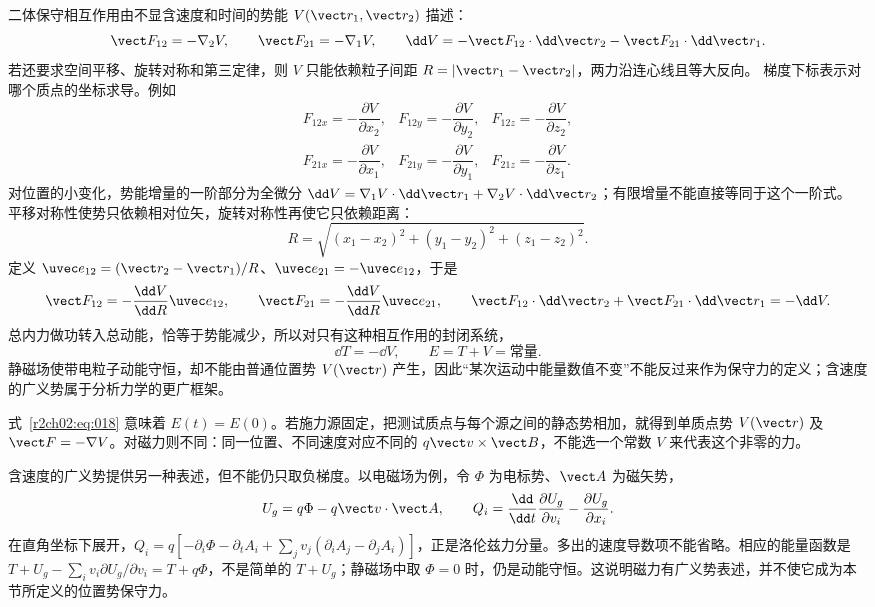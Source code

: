 二体保守相互作用由不显含速度和时间的势能 $V(\vect r_1,\vect r_2)$ 描述：
\begin{equation}
 \vect F_{12}=-\nabla_2V,\qquad \vect F_{21}=-\nabla_1V,\qquad
 \dd V=-\vect F_{12}\cdot\dd\vect r_2-\vect F_{21}\cdot\dd\vect r_1.
 \label{r2ch02:eq:017}
\end{equation}
若还要求空间平移、旋转对称和第三定律，则 $V$ 只能依赖粒子间距 $R=|\vect r_1-\vect r_2|$，两力沿连心线且等大反向。
梯度下标表示对哪个质点的坐标求导。例如
\[
\begin{array}{lll}
 F_{12x}=-\dfrac{\partial V}{\partial x_2},&
 F_{12y}=-\dfrac{\partial V}{\partial y_2},&
 F_{12z}=-\dfrac{\partial V}{\partial z_2},\\[5pt]
 F_{21x}=-\dfrac{\partial V}{\partial x_1},&
 F_{21y}=-\dfrac{\partial V}{\partial y_1},&
 F_{21z}=-\dfrac{\partial V}{\partial z_1}.
\end{array}
\]
对位置的小变化，势能增量的一阶部分为全微分 $\dd V=\nabla_1V\cdot\dd\vect r_1+\nabla_2V\cdot\dd\vect r_2$；有限增量不能直接等同于这个一阶式。
平移对称性使势只依赖相对位矢，旋转对称性再使它只依赖距离：
\[
 R=\sqrt{(x_1-x_2)^2+(y_1-y_2)^2+(z_1-z_2)^2}.
\]
定义 $\uvec e_{12}=(\vect r_2-\vect r_1)/R$、$\uvec e_{21}=-\uvec e_{12}$，于是
\[
 \vect F_{12}=-\frac{\dd V}{\dd R}\uvec e_{12},\qquad
 \vect F_{21}=-\frac{\dd V}{\dd R}\uvec e_{21},\qquad
 \vect F_{12}\cdot\dd\vect r_2+\vect F_{21}\cdot\dd\vect r_1=-\dd V.
\]
总内力做功转入总动能，恰等于势能减少，所以对只有这种相互作用的封闭系统，
\begin{equation}
 \dd T=-\dd V,\qquad E=T+V=\text{常量}.
 \label{r2ch02:eq:018}
\end{equation}
静磁场使带电粒子动能守恒，却不能由普通位置势 $V(\vect r)$ 产生，因此“某次运动中能量数值不变”不能反过来作为保守力的定义；含速度的广义势属于分析力学的更广框架。

式~\eqref{r2ch02:eq:018} 意味着 $E(t)=E(0)$。若施力源固定，把测试质点与每个源之间的静态势相加，就得到单质点势 $V(\vect r)$ 及 $\vect F=-\nabla V$。对磁力则不同：同一位置、不同速度对应不同的 $q\vect v\times\vect B$，不能选一个常数 $V$ 来代表这个非零的力。

含速度的广义势提供另一种表述，但不能仍只取负梯度。以电磁场为例，令 $\Phi$ 为电标势、$\vect A$ 为磁矢势，
\[
 U_g=q\Phi-q\vect v\cdot\vect A,\qquad
 Q_i=\frac{\dd}{\dd t}\frac{\partial U_g}{\partial v_i}
      -\frac{\partial U_g}{\partial x_i}.
\]
在直角坐标下展开，$Q_i=q[-\partial_i\Phi-\partial_t A_i+\sum_jv_j(\partial_iA_j-\partial_jA_i)]$，正是洛伦兹力分量。多出的速度导数项不能省略。相应的能量函数是
$T+U_g-\sum_i v_i\partial U_g/\partial v_i=T+q\Phi$，不是简单的 $T+U_g$；静磁场中取 $\Phi=0$ 时，仍是动能守恒。这说明磁力有广义势表述，并不使它成为本节所定义的位置势保守力。

